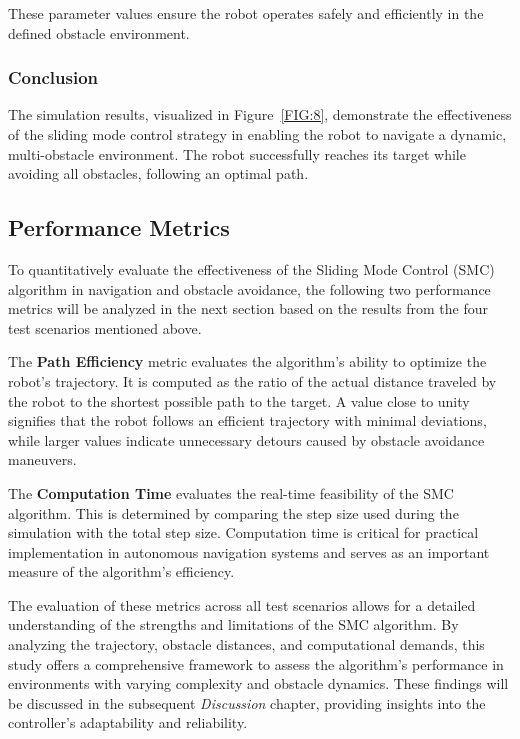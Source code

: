 These parameter values ensure the robot operates safely and efficiently in the defined obstacle environment.


\subsubsection{Conclusion}

The simulation results, visualized in Figure~\ref{FIG:8}, demonstrate the effectiveness of the sliding mode control strategy in enabling the robot to navigate a dynamic, multi-obstacle environment. The robot successfully reaches its target while avoiding all obstacles, following an optimal path.


\subsection{Performance Metrics}

To quantitatively evaluate the effectiveness of the Sliding Mode Control (SMC) algorithm in navigation and obstacle avoidance, the following two performance metrics will be analyzed in the next section based on the results from the four test scenarios mentioned above.

The \textbf{Path Efficiency} metric evaluates the algorithm’s ability to optimize the robot’s trajectory. It is computed as the ratio of the actual distance traveled by the robot to the shortest possible path to the target. A value close to unity signifies that the robot follows an efficient trajectory with minimal deviations, while larger values indicate unnecessary detours caused by obstacle avoidance maneuvers.

The \textbf{Computation Time} evaluates the real-time feasibility of the SMC algorithm. This is determined by comparing the step size used during the simulation with the total step size. Computation time is critical for practical implementation in autonomous navigation systems and serves as an important measure of the algorithm's efficiency.

The evaluation of these metrics across all test scenarios allows for a detailed understanding of the strengths and limitations of the SMC algorithm. By analyzing the trajectory, obstacle distances, and computational demands, this study offers a comprehensive framework to assess the algorithm’s performance in environments with varying complexity and obstacle dynamics. These findings will be discussed in the subsequent \textit{Discussion} chapter, providing insights into the controller’s adaptability and reliability.
